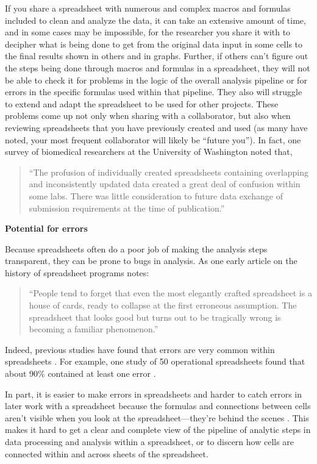 \documentclass[]{tufte-book}
\begin{document}
If you share a spreadsheet with numerous and complex macros and formulas
included to clean and analyze the data, it can take an extensive amount of time,
and in some cases may be impossible, for the researcher you share it with to
decipher what is being done to get from the original data input in some cells to
the final results shown in others and in graphs. Further, if others can't figure
out the steps being done through macros and formulas in a spreadsheet, they will
not be able to check it for problems in the logic of the overall analysis
pipeline or for errors in the specific formulas used within that pipeline. They
also will struggle to extend and adapt the spreadsheet to be used for other
projects. These problems come up not only when sharing with a collaborator, but
also when reviewing spreadsheets that you have previously created and used (as
many have noted, your most frequent collaborator will likely be ``future you'').
In fact, one survey of biomedical researchers at the University of Washington
noted that,

\begin{quote}
``The profusion of individually created spreadsheets containing overlapping and
inconsistently updated data created a great deal of confusion within some labs.
There was little consideration to future data exchange of submission
requirements at the time of publication.''
\citep{anderson2007issues}
\end{quote}

\textbf{Potential for errors}

Because spreadsheets often do a poor job of making the analysis steps
transparent, they can be prone to bugs in analysis. As one early article on
the history of spreadsheet programs notes:

\begin{quote}
``People tend to forget that even the most elegantly crafted spreadsheet is a
house of cards, ready to collapse at the first erroneous assumption. The
spreadsheet that looks good but turns out to be tragically wrong is becoming
a familiar phenomenon.'' \citep{levy1984spreadsheet}
\end{quote}

Indeed, previous studies have found that errors are very common within
spreadsheets \citep{hermans2016spreadsheets}. For example, one study of 50
operational spreadsheets found that about 90\% contained at least one error
\citep{powell2009errors}.

In part, it is easier to make errors in spreadsheets and harder to catch errors
in later work with a spreadsheet because the formulas and connections between
cells aren't visible when you look at the spreadsheet---they're behind the
scenes \citep{birch2018future}. This makes it hard to get a clear and complete
view of the pipeline of analytic steps in data processing and analysis within a
spreadsheet, or to discern how cells are connected within and across sheets of
the spreadsheet.
\end{document}
